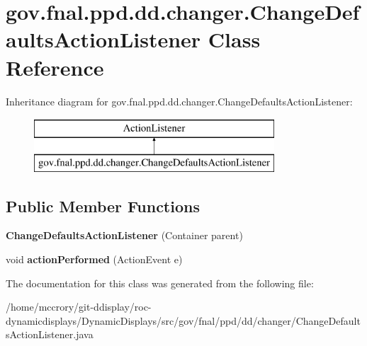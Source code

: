 \hypertarget{classgov_1_1fnal_1_1ppd_1_1dd_1_1changer_1_1ChangeDefaultsActionListener}{\section{gov.\-fnal.\-ppd.\-dd.\-changer.\-Change\-Defaults\-Action\-Listener Class Reference}
\label{classgov_1_1fnal_1_1ppd_1_1dd_1_1changer_1_1ChangeDefaultsActionListener}
}
Inheritance diagram for gov.\-fnal.\-ppd.\-dd.\-changer.\-Change\-Defaults\-Action\-Listener\-:\begin{figure}[H]
\begin{center}
\leavevmode
\includegraphics[height=2.000000cm]{classgov_1_1fnal_1_1ppd_1_1dd_1_1changer_1_1ChangeDefaultsActionListener}
\end{center}
\end{figure}
\subsection*{Public Member Functions}
\begin{DoxyCompactItemize}
\item 
\hypertarget{classgov_1_1fnal_1_1ppd_1_1dd_1_1changer_1_1ChangeDefaultsActionListener_a3b0b37ba3ebf3a0b878c7715b46c5c0c}{{\bfseries Change\-Defaults\-Action\-Listener} (Container parent)}\label{classgov_1_1fnal_1_1ppd_1_1dd_1_1changer_1_1ChangeDefaultsActionListener_a3b0b37ba3ebf3a0b878c7715b46c5c0c}

\item 
\hypertarget{classgov_1_1fnal_1_1ppd_1_1dd_1_1changer_1_1ChangeDefaultsActionListener_a29a64447afe74de6954ba633ee8775ec}{void {\bfseries action\-Performed} (Action\-Event e)}\label{classgov_1_1fnal_1_1ppd_1_1dd_1_1changer_1_1ChangeDefaultsActionListener_a29a64447afe74de6954ba633ee8775ec}

\end{DoxyCompactItemize}


The documentation for this class was generated from the following file\-:\begin{DoxyCompactItemize}
\item 
/home/mccrory/git-\/ddisplay/roc-\/dynamicdisplays/\-Dynamic\-Displays/src/gov/fnal/ppd/dd/changer/Change\-Defaults\-Action\-Listener.\-java\end{DoxyCompactItemize}
